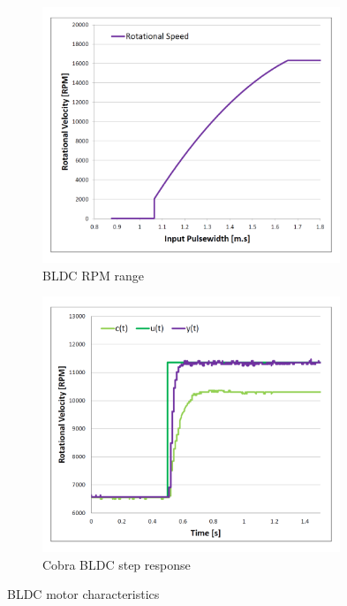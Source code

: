 \begin{figure}[htbp]
\begin{subfigure}{0.5\textwidth}
\centering
\includegraphics[width=0.98\textwidth]{graphs/bldc-range}
\caption{BLDC RPM range}
\label{fig:bldc-range}
\end{subfigure}
\begin{subfigure}{0.5\textwidth}
\centering
\includegraphics[width=0.98\textwidth]{graphs/BLDC-step}
\caption{Cobra BLDC step response}
\label{fig:bldc-step}
\end{subfigure}
\caption{BLDC motor characteristics}
\end{figure}
